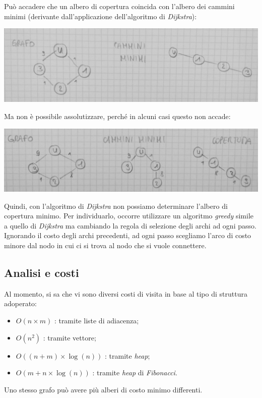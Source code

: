 Può accadere che un albero di copertura coincida con l'albero dei cammini minimi (derivante dall'applicazione dell'algoritmo di \textit{Dijkstra}): \\
\begin{center}
	\includegraphics[width=.75\textwidth]{res/copertura-caso1.jpg} \hfill
\end{center}

Ma non è possibile assolutizzare, perché in alcuni casi questo non accade: \\
\begin{center}
	\includegraphics[width=.75\textwidth]{res/copertura-caso2.jpg} \hfill
\end{center}

Quindi, con l'algoritmo di \textit{Dijkstra} non possiamo determinare l'albero di copertura minimo. Per individuarlo, occorre utilizzare un algoritmo \textit{greedy} simile a quello di \textit{Dijkstra} ma cambiando la regola di selezione degli archi ad ogni passo. Ignorando il costo degli archi precedenti, ad ogni passo scegliamo l'arco di costo minore dal nodo in cui ci si trova al nodo che si vuole connettere.

\subsection{Analisi e costi}
Al momento, si sa che vi sono diversi costi di visita in base al tipo di struttura adoperato:
\begin{itemize}
	\item $O(n\times m)$ : tramite liste di adiacenza;
	\item $O(n^2)$ : tramite vettore;
	\item $O((n+m)\times \log(n))$ : tramite \textit{heap};
	\item $O(m+n\times \log(n))$ : tramite \textit{heap} di \textit{Fibonacci}.
\end{itemize}
Uno stesso grafo può avere più alberi di costo minimo differenti.


